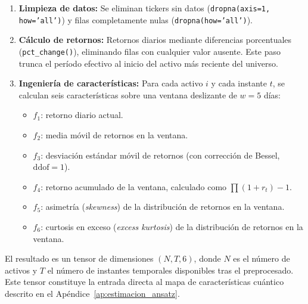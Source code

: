 \begin{enumerate}
    \item \textbf{Limpieza de datos:} Se eliminan tickers sin datos (\texttt{dropna(axis=1, how='all')}) y filas completamente nulas (\texttt{dropna(how='all')}).
    \item \textbf{Cálculo de retornos:} Retornos diarios mediante diferencias porcentuales (\texttt{pct\_change()}), eliminando filas con cualquier valor ausente. Este paso trunca el período efectivo al inicio del activo más reciente del universo.
    \item \textbf{Ingeniería de características:} Para cada activo $i$ y cada instante $t$, se calculan seis características sobre una ventana deslizante de $w=5$ días:
    \begin{itemize}
        \item $f_1$: retorno diario actual.
        \item $f_2$: media móvil de retornos en la ventana.
        \item $f_3$: desviación estándar móvil de retornos (con corrección de Bessel, $\text{ddof}=1$).
        \item $f_4$: retorno acumulado de la ventana, calculado como $\prod(1 + r_t) - 1$.
        \item $f_5$: asimetría (\textit{skewness}) de la distribución de retornos en la ventana.
        \item $f_6$: curtosis en exceso (\textit{excess kurtosis}) de la distribución de retornos en la ventana.
    \end{itemize}
\end{enumerate}

El resultado es un tensor de dimensiones $(N, T, 6)$, donde $N$ es el número de activos y $T$ el número de instantes temporales disponibles tras el preprocesado. Este tensor constituye la entrada directa al mapa de características cuántico descrito en el Apéndice~\ref{ap:estimacion_ansatz}.
